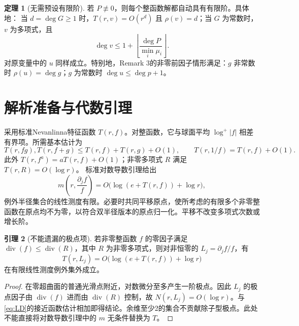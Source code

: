 \documentclass[UTF8,a4paper,zihao=-4,fontset=none]{ctexart}
\numberwithin{equation}{section}
\theoremstyle{definition}
\newtheorem{theorem}{定理}[section]
\newtheorem{lemma}[theorem]{引理}
\theoremstyle{definition}\newtheorem{definition}[theorem]{定义}
\newcommand{\Div}{\operatorname{div}}
\begin{document}
\begin{theorem}[无需预设有限阶]\label{thm:growth}
若 $P\not\equiv0$，则每个整函数解都自动具有有限阶。具体地：
当 $d=\deg G\ge1$ 时，$T(r,v)=O(r^d)$ 且 $\rho(v)=d$；当 $G$ 为常数时，$v$ 为多项式，且
\begin{equation}\label{eq:degree}
 \deg v\le1+\left\lfloor\frac{\deg P}{\min_i\mu_i}\right\rfloor.
\end{equation}
对原变量中的 $u$ 同样成立。特别地，Remark 3的非零前因子情形满足：$g$ 非常数时 $\rho(u)=\deg g$；$g$ 为常数时 $\deg u\le\deg p+1$。
\end{theorem}

\section{解析准备与代数引理}
采用标准Nevanlinna特征函数 $T(r,f)$。对整函数，它与球面平均 $\log^+|f|$ 相差有界项。所需基本估计为
\[
 T(r,fg),T(r,f+g)\le T(r,f)+T(r,g)+O(1),\qquad
 T(r,1/f)=T(r,f)+O(1).
\]
此外 $T(r,f^a)=aT(r,f)+O(1)$；非零多项式 $R$ 满足 $T(r,R)=O(\log r)$。
标准对数导数引理\cite{Vitter1977,HanLiu2025}给出
\begin{equation}\label{eq:LD}
 m\left(r,\frac{\partial_jf}{f}\right)
 =O\bigl(\log(e+T(r,f))+\log r\bigr),
\end{equation}
例外半径集合的线性测度有限。必要时共同平移原点，使所考虑的有限多个非零整函数在原点均不为零，以符合双半径版本的原点归一化。平移不改变多项式次数或增长阶。

\begin{lemma}[不能遗漏的极点项]\label{lem:pole}
若非零整函数 $f$ 的零因子满足 $\Div(f)\le\Div(R)$，其中 $R$ 为非零多项式，则对非恒零的 $L_j=\partial_jf/f$，有
\[
 T(r,L_j)=O\bigl(\log(e+T(r,f))+\log r\bigr)
\]
在有限线性测度例外集外成立。
\end{lemma}
\begin{proof}
在零超曲面的普通光滑点附近，对数微分至多产生一阶极点。因此 $L_j$ 的极点因子由 $\Div(f)$ 进而由 $\Div(R)$ 控制，故 $N(r,L_j)=O(\log r)$。与\eqref{eq:LD}的接近函数估计相加即得结论。余维至少2的集合不贡献除子型极点。此处不能直接将对数导数引理中的 $m$ 无条件替换为 $T$。
\end{proof}
\end{document}
